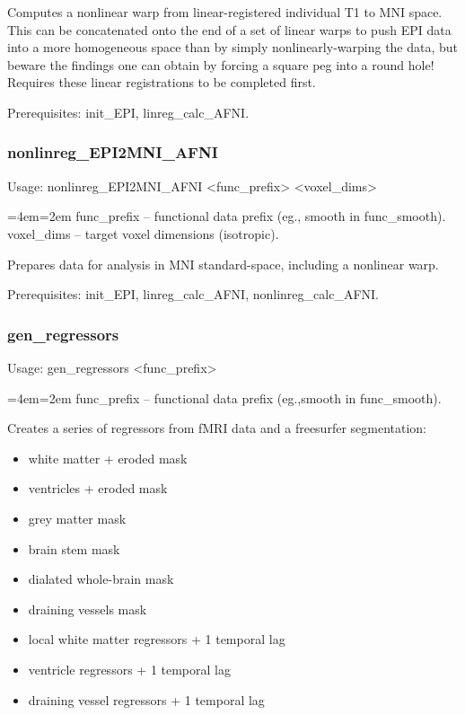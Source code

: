 \documentclass[final,titlepage,letterpaper,oneside,12pt]{article}
\renewcommand{\texttt}[2][BrickRed]{\textcolor{#1}{\ttfamily #2}}%
\newenvironment{blockquote}{%
  \par%
  \medskip
  \leftskip=4em\rightskip=2em%
  \noindent\ignorespaces}{%
  \par\medskip}
\begin{document}
\noindent Computes a nonlinear warp from linear-registered individual T1 to MNI space. This can be concatenated onto the end of a set of linear warps to push EPI data into a more homogeneous space than by simply nonlinearly-warping the data, but beware the findings one can obtain by forcing a square peg into a round hole! Requires these linear registrations to be completed first.

Prerequisites: \texttt{init\_EPI}, \texttt{linreg\_calc\_AFNI}.

\subsubsection{nonlinreg\_EPI2MNI\_AFNI}
Usage: \texttt{nonlinreg\_EPI2MNI\_AFNI <func\_prefix> <voxel\_dims>}

\begin{blockquote}
func\_prefix -- functional data prefix (eg., smooth in func\_smooth). \\
voxel\_dims -- target voxel dimensions (isotropic). \
\end{blockquote}

\noindent Prepares data for analysis in MNI standard-space, including a nonlinear warp.

Prerequisites: \texttt{init\_EPI}, \texttt{linreg\_calc\_AFNI}, \texttt{nonlinreg\_calc\_AFNI}.

\subsubsection{gen\_regressors}
Usage: \texttt{gen\_regressors <func\_prefix>}

\begin{blockquote}
func\_prefix -- functional data prefix (eg.,smooth in func\_smooth).
\end{blockquote}

\noindent Creates a series of regressors from fMRI data and a freesurfer segmentation: 

\begin{itemize} \itemsep-2pt
	\item{white matter + eroded mask}
	\item{ventricles + eroded mask}
	\item{grey matter mask}
	\item{brain stem mask}
	\item{dialated whole-brain mask}
	\item{draining vessels mask}
	\item{local white matter regressors + 1 temporal lag}
	\item{ventricle regressors + 1 temporal lag}
	\item{draining vessel regressors + 1 temporal lag}
\end{itemize}
\end{document}
